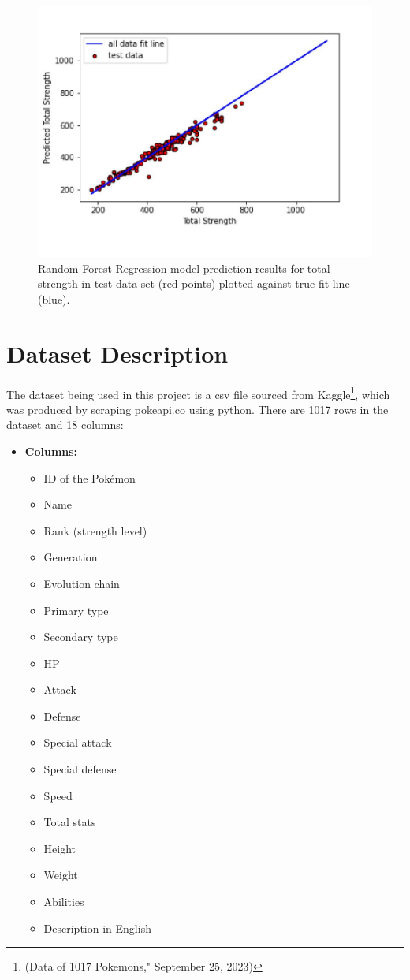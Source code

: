 \documentclass[conference]{IEEEtran}
\begin{document}
\begin{figure}
  \includegraphics[width=1\linewidth]{fig1.jpg}
  \caption{Random Forest Regression model prediction results for total strength in test data set (red points) plotted against true fit line (blue).}
  \label{fig:your_photo}
\end{figure}
            
\section{Dataset Description}
  The dataset being used in this project is a csv file sourced from Kaggle\footnote{(Data of 1017 Pokemons," September 25, 2023)}, which was produced by scraping pokeapi.co using python. There are 1017 rows in the dataset and 18 columns:

\begin{itemize}
    \item \textbf{Columns:} 
    \begin{itemize}
        \item ID of the Pokémon
        \item Name
        \item Rank (strength level)
        \item Generation
        \item Evolution chain
        \item Primary type
        \item Secondary type
        \item HP
        \item Attack
        \item Defense
        \item Special attack
        \item Special defense
        \item Speed
        \item Total stats
        \item Height
        \item Weight
        \item Abilities
        \item Description in English        
    \end{itemize}
\end{itemize}
\end{document}
